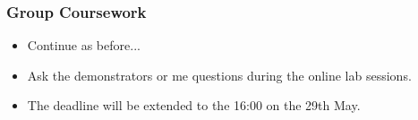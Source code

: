 \documentclass[\beamerclass]{beamer}
\begin{document}
\begin{frame}
\frametitle{Group Coursework}

\begin{itemize}
	\item<+-> Continue as before...
	\item<+-> Ask the demonstrators or me questions during the online lab sessions.
	\item<+-> The deadline will be extended to the 16:00 on the 29th May. 
\end{itemize}

\end{frame}
\end{document}
